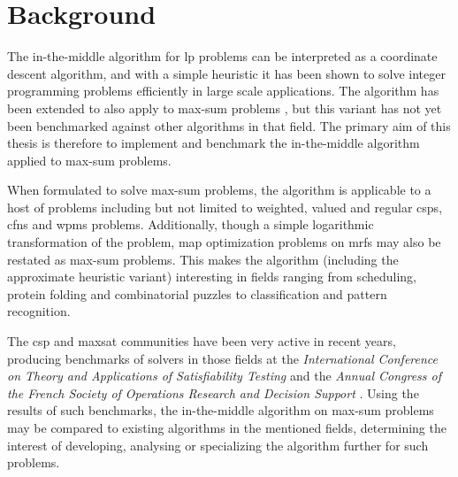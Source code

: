\section{Background}
The in-the-middle algorithm \parencite{Wedelin95} for \gls{lp} problems can be interpreted as a coordinate descent algorithm, and with a simple heuristic it has been shown to solve integer programming problems efficiently in large scale applications.
The algorithm has been extended to also apply to max-sum problems \parencites{Wedelin08}{Wedelin13}, but this variant has not yet been benchmarked against other algorithms in that field.
The primary aim of this thesis is therefore to implement and benchmark the in-the-middle algorithm applied to max-sum problems.

When formulated to solve max-sum problems, the algorithm is applicable to a host of problems including but not limited to weighted, valued and regular \glspl{csp}, \glspl{cfn} and \gls{wpms} problems.
Additionally, though a simple logarithmic transformation of the problem, \gls{map} optimization problems on \glspl{mrf} may also be restated as max-sum problems.
This makes the algorithm (including the approximate heuristic variant) interesting in fields ranging from scheduling, protein folding and combinatorial puzzles to classification and pattern recognition.

The \gls{csp} and \gls{maxsat} communities have been very active in recent years, producing benchmarks of solvers in those fields at the \emph{International Conference on Theory and Applications of Satisfiability Testing} \parencite{Argelich11} and the \emph{Annual Congress of the French Society of Operations Research and Decision Support} \parencite{Allouche14b}.
Using the results of such benchmarks, the in-the-middle algorithm on max-sum problems may be compared to existing algorithms in the mentioned fields, determining the interest of developing, analysing or specializing the algorithm further for such problems.
